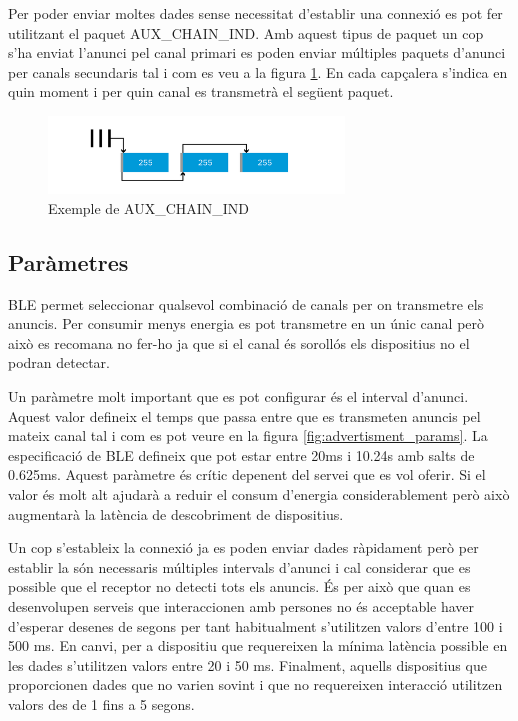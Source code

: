Per poder enviar moltes dades sense necessitat d'establir una connexió es pot fer utilitzant el paquet AUX\_CHAIN\_IND.
Amb aquest tipus de paquet un cop s'ha enviat l'anunci pel canal primari es poden enviar múltiples paquets d'anunci per canals secundaris tal i com es veu a la figura \ref{fig:aux_chain_ind}.
En cada capçalera s'indica en quin moment i per quin canal es transmetrà el següent paquet.

\begin{figure}[h!]
	\begin{center}
		\includegraphics[width=0.7\textwidth]{./images/aux_chain_ind.png}
		\caption{Exemple de AUX\_CHAIN\_IND \cite{aux_chain_ind}}
		\label{fig:aux_chain_ind}
	\end{center}
\end{figure}

\subsection{Paràmetres}
BLE permet seleccionar qualsevol combinació de canals per on transmetre els anuncis.
Per consumir menys energia es pot transmetre en un únic canal però això es recomana no fer-ho ja que si el canal és sorollós els dispositius no el podran detectar.

Un paràmetre molt important que es pot configurar és el interval d'anunci.
Aquest valor defineix el temps que passa entre que es transmeten anuncis pel mateix canal tal i com es pot veure en la figura \ref{fig:advertisment_params}.
La especificació de BLE defineix que pot estar entre 20ms i 10.24s amb salts de 0.625ms.
Aquest paràmetre és crític depenent del servei que es vol oferir.
Si el valor és molt alt ajudarà a reduir el consum d'energia considerablement però això augmentarà la latència de descobriment de dispositius.

Un cop s'estableix la connexió ja es poden enviar dades ràpidament però per establir la són necessaris múltiples intervals d'anunci i cal considerar que es possible que el receptor no detecti tots els anuncis. 
És per això que quan es desenvolupen serveis que interaccionen amb persones no és acceptable haver d'esperar desenes de segons per tant habitualment s'utilitzen valors d'entre 100 i 500 ms.
En canvi, per a dispositiu que requereixen la mínima latència possible en les dades s'utilitzen valors entre 20 i 50 ms.
Finalment, aquells dispositius que proporcionen dades que no varien sovint i que no requereixen interacció utilitzen valors des de 1 fins a 5 segons.

